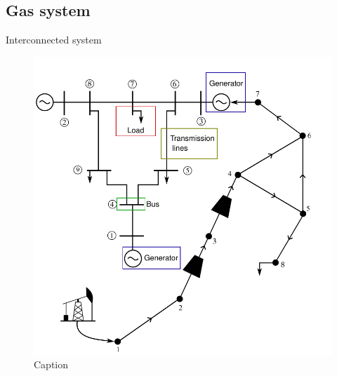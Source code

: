\documentclass[hyperref={colorlinks,citecolor=blue,linkcolor=blue,urlcolor=blue}]{beamer}
\begin{document}
\subsection{Gas system}
\begin{frame}{Interconnected system} 
\begin{figure}
    \centering
    \includegraphics[scale=0.6]{figures/powe-gas.pdf}
    \caption{Caption}
    \label{fig:powe-gas}
\end{figure}
\end{frame}
\end{document}
